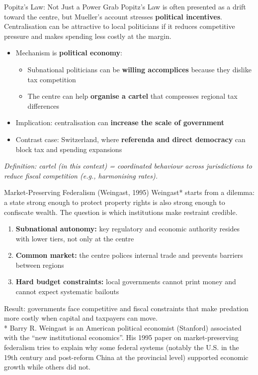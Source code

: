 \documentclass[10pt]{beamer}
\begin{document}
\begin{frame}{Popitz's Law: Not Just a Power Grab}
\small
Popitz’s Law is often presented as a drift toward the centre, but Mueller’s account stresses \textbf{political incentives}.
Centralisation can be attractive to local politicians if it reduces competitive pressure and makes spending less costly at the margin.

\begin{itemize}
\item Mechanism is \textbf{political economy}:
\begin{itemize}
\item Subnational politicians can be \textbf{willing accomplices} because they dislike tax competition
\item The centre can help \textbf{organise a cartel} that compresses regional tax differences
\end{itemize}
\item Implication: centralisation can \textbf{increase the scale of government}
\item Contrast case: Switzerland, where \textbf{referenda and direct democracy} can block tax and spending expansions
\end{itemize}

\vspace{0.1cm}
\footnotesize
\textit{Definition: cartel (in this context) = coordinated behaviour across jurisdictions to reduce fiscal competition (e.g., harmonising rates).}
\end{frame}

\begin{frame}{Market-Preserving Federalism (Weingast, 1995)}
Weingast* starts from a dilemma: a state strong enough to protect property rights is also strong enough to confiscate wealth.
The question is which institutions make restraint credible.

\begin{enumerate}
\item \textbf{Subnational autonomy:} key regulatory and economic authority resides with lower tiers, not only at the centre
\item \textbf{Common market:} the centre polices internal trade and prevents barriers between regions
\item \textbf{Hard budget constraints:} local governments cannot print money and cannot expect systematic bailouts
\end{enumerate}

\vspace{0.1cm}
\alert{\footnotesize Result: governments face competitive and fiscal constraints that make predation more costly when capital and taxpayers can move.} \\
\footnotesize
* Barry R. Weingast is an American political economist (Stanford) associated with the “new institutional economics”. His 1995 paper on market-preserving federalism tries to explain why some federal systems (notably the U.S. in the 19th century and post-reform China at the provincial level) supported economic growth while others did not.
\end{frame}
\end{document}
